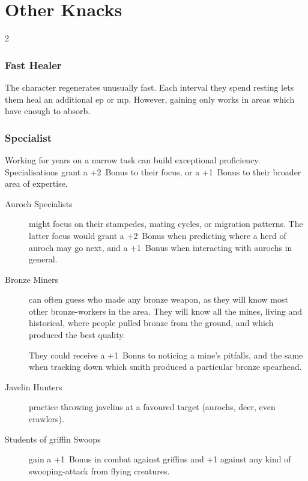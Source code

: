\section{Other Knacks}

\begin{multicols}{2}

\subsubsection{Fast Healer}

The character regenerates unusually fast.
Each \gls{interval} they spend resting lets them heal an additional \gls{ep} or \gls{mp}.
However, gaining  only works in \glspl{area} which have enough to absorb.

\subsubsection{Specialist}
\label{specialist}

Working for years on a narrow task can build exceptional proficiency.
Specialisations grant a +2~Bonus to their focus, or a +1~Bonus to their broader area of expertise.

\begin{description}
  \item[Auroch Specialists]
  might focus on their stampedes, mating cycles, or migration patterns.
  The latter focus would grant a +2~Bonus when predicting where a herd of auroch may go next, and a +1~Bonus when interacting with aurochs in general.

  \item[Bronze Miners]
  can often guess who made any bronze weapon, as they will know most other
  bronze-workers in the area.  They will know all the mines, living and
  historical, where people pulled bronze from the ground, and which produced
  the best quality.

  They could receive a +1~Bonus to noticing a mine's pitfalls, and the same
  when tracking down which smith produced a particular bronze spearhead.

  \item[Javelin Hunters]
  practice throwing javelins at a favoured target (aurochs, deer, even \glspl{crawler}).

  \item[Students of \Gls{griffin} Swoops]
  gain a +1~Bonus in combat against \glspl{griffin} and +1 against any kind of
  swooping-attack from flying creatures.


\end{description}
\end{multicols}
